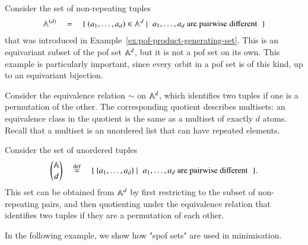 \begin{myexample}[Subsets]
Consider the    set of non-repeating tuples
\begin{align*}
\atoms^{(d)} 
\quad  = \quad 
\setbuild{(a_1,\ldots,a_d) \in \atoms^d}{$a_1,\ldots,a_d$ are pairwise different}
\end{align*}
that was introduced in Example~\ref{ex:pof-product-generating-set}. This is an equivariant subset of the pof set $\mathbb A^d$,  but it is not a pof set on its own. This example is particularly important, since every orbit in a pof set is of this kind, up to an equivariant bijection.     
\end{myexample}
 
\begin{myexample}[Quotients] Consider the equivalence relation $\sim$ on $\mathbb A^d$, which identifies two tuples if one is a permutation of the other. The corresponding quotient describes multisets: an equivalence class in the quotient is  the same as a multiset of exactly $d$ atoms. Recall that a multiset is an unordered list that can have repeated elements. 
\end{myexample}

\begin{myexample}
    [Subquotients]  Consider the  set of unordered tuples 
\begin{align*}
{\atoms \choose d} 
\quad \eqdef \quad
\setbuild{\set{a_1,\ldots,a_d}}{$a_1,\ldots,a_d$ are pairwise different}.
\end{align*}
This set can be obtained from $\mathbb A^d$ by first restricting to the subset of non-repeating pairs, and then quotienting under the equivalence relation that identifies two tuples if they are a permutation of each other.
\end{myexample}



In the following example, we show how "spof sets" are used in minimisation. 




